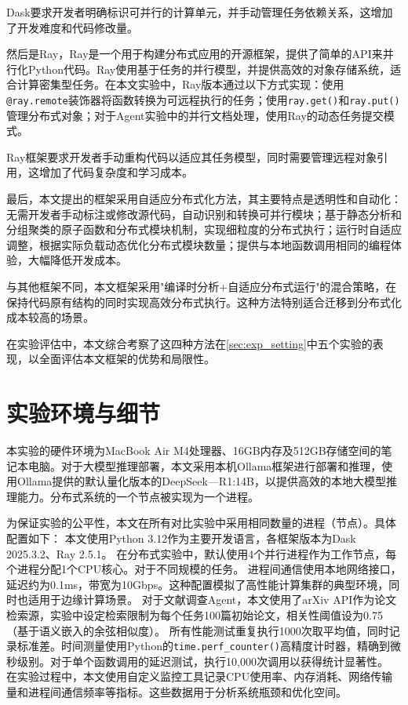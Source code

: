 Dask要求开发者明确标识可并行的计算单元，并手动管理任务依赖关系，这增加了开发难度和代码修改量。

然后是Ray，Ray是一个用于构建分布式应用的开源框架，提供了简单的API来并行化Python代码。Ray使用基于任务的并行模型，并提供高效的对象存储系统，适合计算密集型任务。在本文实验中，Ray版本通过以下方式实现：使用\texttt{@ray.remote}装饰器将函数转换为可远程执行的任务；使用\texttt{ray.get()}和\texttt{ray.put()}管理分布式对象；对于Agent实验中的并行文档处理，使用Ray的动态任务提交模式。

Ray框架要求开发者手动重构代码以适应其任务模型，同时需要管理远程对象引用，这增加了代码复杂度和学习成本。

最后，本文提出的框架采用自适应分布式化方法，其主要特点是透明性和自动化：无需开发者手动标注或修改源代码，自动识别和转换可并行模块；基于静态分析和分组聚类的原子函数和分布式模块机制，实现细粒度的分布式执行；运行时自适应调整，根据实际负载动态优化分布式模块数量；提供与本地函数调用相同的编程体验，大幅降低开发成本。

与其他框架不同，本文框架采用"编译时分析+自适应分布式运行"的混合策略，在保持代码原有结构的同时实现高效分布式执行。这种方法特别适合迁移到分布式化成本较高的场景。

在实验评估中，本文综合考察了这四种方法在\ref{sec:exp_setting}中五个实验的表现，以全面评估本文框架的优势和局限性。

\section{实验环境与细节}

本实验的硬件环境为MacBook Air M4处理器、16GB内存及512GB存储空间的笔记本电脑。对于大模型推理部署，本文采用本机Ollama框架进行部署和推理，使用Ollama提供的默认量化版本的DeepSeek—R1:14B，以提供高效的本地大模型推理能力。分布式系统的一个节点被实现为一个进程。

为保证实验的公平性，本文在所有对比实验中采用相同数量的进程（节点）。具体配置如下：
本文使用Python 3.12作为主要开发语言，各框架版本为Dask 2025.3.2、Ray 2.5.1。
在分布式实验中，默认使用4个并行进程作为工作节点，每个进程分配1个CPU核心。对于不同规模的任务。
进程间通信使用本地网络接口，延迟约为0.1ms，带宽为10Gbps。这种配置模拟了高性能计算集群的典型环境，同时也适用于边缘计算场景。
对于文献调查Agent，本文使用了arXiv API作为论文检索源，实验中设定检索限制为每个任务100篇初始论文，相关性阈值设为0.75（基于语义嵌入的余弦相似度）。
所有性能测试重复执行1000次取平均值，同时记录标准差。时间测量使用Python的\texttt{time.perf\_counter()}高精度计时器，精确到微秒级别。对于单个函数调用的延迟测试，执行10,000次调用以获得统计显著性。
在实验过程中，本文使用自定义监控工具记录CPU使用率、内存消耗、网络传输量和进程间通信频率等指标。这些数据用于分析系统瓶颈和优化空间。

